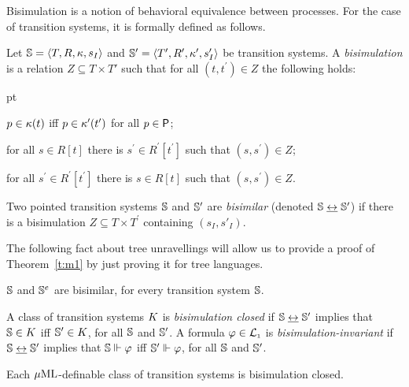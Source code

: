 Bisimulation is a notion of behavioral equivalence between processes.
For the case of  transition systems, it is formally defined as follows.

\begin{definition}
Let $\mathbb{S} = \langle{T, R, \kappa, s_I}\rangle$ and
$\mathbb{S}' = \langle{T', R', \kappa', s'_I}\rangle$ be transition systems.
A \emph{bisimulation} is a relation $Z \subseteq T \times T'$
such that for all $(t,t^{\prime}) \in Z$ the following holds:
\begin{description}
   pt
  \item[(atom)] $p \in \kappa(t)$ iff $p \in \kappa^{\prime}(t')$ for all $p\in\mathsf{P}$;
  \item[(forth)] for all $s \in R[t]$ there is $s^{\prime} \in R^{\prime}[t^{\prime}]$ such that $(s,s^{\prime}) \in Z$;
  \item[(back)] for all $s^{\prime} \in R^{\prime}[t^{\prime}]$ there is $s \in R[t]$ such that $(s,s^{\prime}) \in Z$.
\end{description}
%
Two pointed transition systems $\mathbb{S}$ and $\mathbb{S}^{\prime}$ are
\emph{bisimilar} (denoted $\mathbb{S} \mathrel{\underline{\leftrightarrow}} \mathbb{S}^{\prime}$) if there is a
bisimulation $Z \subseteq T \times T^{\prime}$ containing $(s_I,s'_I)$.
\end{definition}

The following fact about tree unravellings will allow us to provide a proof of
Theorem~\ref{t:m1} by just proving it for tree languages.

\begin{fact}\label{prop:tree_unrav}
$\mathbb{S}$ and $\mathbb{S}^e$ are bisimilar, for every transition system $\mathbb{S}$.
\end{fact}

A class of transition systems $K$ is \emph{bisimulation closed} if $\mathbb{S}
\mathrel{\underline{\leftrightarrow}} \mathbb{S}^{\prime}$ implies that $\mathbb{S} \in K$ iff $\mathbb{S}^{\prime}
\in K$, for all $\mathbb{S}$ and $\mathbb{S}^{\prime}$.
A formula $\varphi \in \mathcal{L}_{\scriptscriptstyle 1}$ is \emph{bisimulation-invariant} if $\mathbb{S} \mathrel{\underline{\leftrightarrow}}
\mathbb{S}^{\prime}$ implies that $\mathbb{S} \Vdash \varphi$ iff $\mathbb{S}^{\prime}
\Vdash \varphi$, for all $\mathbb{S}$ and $\mathbb{S}^{\prime}$.

\begin{fact}
Each $\mu\mathrm{ML}$-definable class of transition systems is bisimulation closed.
\end{fact}
